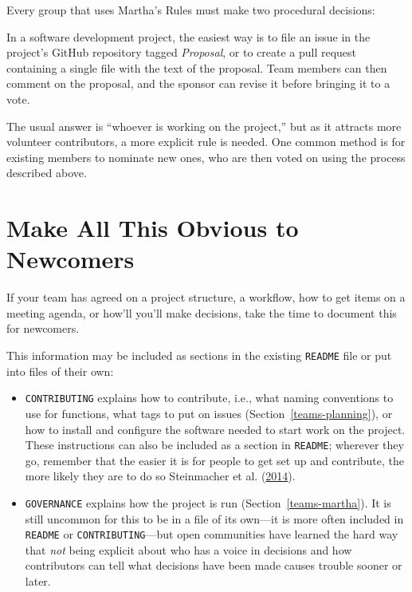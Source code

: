 \documentclass[
]{krantz}
\providecommand{\tightlist}{%
  \setlength{\itemsep}{0pt}\setlength{\parskip}{0pt}}
\begin{document}
Every group that uses Martha's Rules must make two procedural decisions:

\begin{description}
\tightlist
\item[How are proposals put forward?]
In a software development project,
the easiest way is to file an issue in the project's GitHub repository
tagged \emph{Proposal},
or to create a pull request containing a single file
with the text of the proposal.
Team members can then comment on the proposal,
and the sponsor can revise it
before bringing it to a vote.
\item[Who gets to vote?]
The usual answer is ``whoever is working on the project,''
but as it attracts more volunteer contributors,
a more explicit rule is needed.
One common method is for existing members to nominate new ones,
who are then voted on using the process described above.
\end{description}

\hypertarget{teams-documentation}{%
\section{Make All This Obvious to Newcomers}\label{teams-documentation}}

If your team has agreed on a project structure,
a workflow,
how to get items on a meeting agenda, or
how'll you'll make decisions,
take the time to document this for newcomers.

This information may be included as sections in the existing \texttt{README} file
or put into files of their own:

\begin{itemize}
\item
  \texttt{CONTRIBUTING}
  explains how to contribute,
  i.e.,
  what naming conventions to use for functions,
  what tags to put on issues (Section~\ref{teams-planning}),
  or how to install and configure the software needed to start work on the project.
  These instructions can also be included as a section in \texttt{README};
  wherever they go,
  remember that the easier it is for people to get set up and contribute,
  the more likely they are to do so Steinmacher et al. (\protect\hyperlink{ref-Stei2014}{2014}).
\item
  \texttt{GOVERNANCE}
  explains how the project is run (Section~\ref{teams-martha}).
  It is still uncommon for this to be in a file of its own---it is more often included
  in \texttt{README} or \texttt{CONTRIBUTING}---but open communities have learned the hard way
  that \emph{not} being explicit about who has a voice in decisions
  and how contributors can tell what decisions have been made
  causes trouble sooner or later.
\end{itemize}
\end{document}
